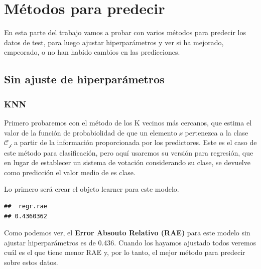\documentclass[
  11pt,
  a4paper,
]{article}
\newenvironment{Shaded}{\begin{snugshade}}{\end{snugshade}}
\newcommand{\AttributeTok}[1]{\textcolor[rgb]{0.77,0.63,0.00}{#1}}
\newcommand{\FunctionTok}[1]{\textcolor[rgb]{0.00,0.00,0.00}{#1}}
\newcommand{\NormalTok}[1]{#1}
\newcommand{\OtherTok}[1]{\textcolor[rgb]{0.56,0.35,0.01}{#1}}
\newcommand{\SpecialCharTok}[1]{\textcolor[rgb]{0.00,0.00,0.00}{#1}}
\newcommand{\StringTok}[1]{\textcolor[rgb]{0.31,0.60,0.02}{#1}}
\begin{document}
\section{Métodos para predecir}

En esta parte del trabajo vamos a probar con varios métodos para
predecir los datos de test, para luego ajustar hiperparámetros y ver si
ha mejorado, empeorado, o no han habido cambios en las predicciones.

\subsection{Sin ajuste de hiperparámetros}
\subsubsection{KNN}

Primero probaremos con el método de los K vecinos más cercanos, que
estima el valor de la función de probabiolidad de que un elemento
\(\mathcal{x}\) pertenezca a la clase \(\mathcal{C_j}\) a partir de la
información proporcionada por los predictores. Este es el caso de este
método para clasificación, pero aquí usaremos su versión para regresión,
que en lugar de establecer un sistema de votación considerando su clase,
se devuelve como predicción el valor medio de es clase.

Lo primero será crear el objeto learner para este modelo.

\begin{Shaded}
\end{Shaded}

\begin{verbatim}
##  regr.rae 
## 0.4360362
\end{verbatim}

Como podemos ver, el \textbf{Error Absouto Relativo (RAE)} para este
modelo sin ajustar hiperparámetros es de 0.436. Cuando los hayamos
ajustado todos veremos cuál es el que tiene menor RAE y, por lo tanto,
el mejor método para predecir sobre estos datos.
\end{document}
